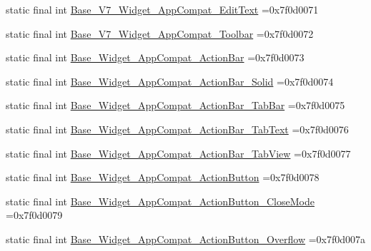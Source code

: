 \begin{DoxyCompactItemize}
\item 
static final int \mbox{\hyperlink{classbr_1_1unb_1_1cic_1_1mp_1_1marketmaster_1_1R_1_1style_a69c5f2b050ad0f94f669394901ca6ee9}{Base\+\_\+\+V7\+\_\+\+Widget\+\_\+\+App\+Compat\+\_\+\+Edit\+Text}} =0x7f0d0071
\item 
static final int \mbox{\hyperlink{classbr_1_1unb_1_1cic_1_1mp_1_1marketmaster_1_1R_1_1style_a447681e0006cc859c5e571cad4abc5b6}{Base\+\_\+\+V7\+\_\+\+Widget\+\_\+\+App\+Compat\+\_\+\+Toolbar}} =0x7f0d0072
\item 
static final int \mbox{\hyperlink{classbr_1_1unb_1_1cic_1_1mp_1_1marketmaster_1_1R_1_1style_ae5d1bd9c51e0013748cc84118859255c}{Base\+\_\+\+Widget\+\_\+\+App\+Compat\+\_\+\+Action\+Bar}} =0x7f0d0073
\item 
static final int \mbox{\hyperlink{classbr_1_1unb_1_1cic_1_1mp_1_1marketmaster_1_1R_1_1style_a1089d7c2f8714ae56abdd1f0379cc9e5}{Base\+\_\+\+Widget\+\_\+\+App\+Compat\+\_\+\+Action\+Bar\+\_\+\+Solid}} =0x7f0d0074
\item 
static final int \mbox{\hyperlink{classbr_1_1unb_1_1cic_1_1mp_1_1marketmaster_1_1R_1_1style_a9ce4d93274226d252f26c3da0dc4b869}{Base\+\_\+\+Widget\+\_\+\+App\+Compat\+\_\+\+Action\+Bar\+\_\+\+Tab\+Bar}} =0x7f0d0075
\item 
static final int \mbox{\hyperlink{classbr_1_1unb_1_1cic_1_1mp_1_1marketmaster_1_1R_1_1style_a8eeb343466f6e878e9281cb6714e2823}{Base\+\_\+\+Widget\+\_\+\+App\+Compat\+\_\+\+Action\+Bar\+\_\+\+Tab\+Text}} =0x7f0d0076
\item 
static final int \mbox{\hyperlink{classbr_1_1unb_1_1cic_1_1mp_1_1marketmaster_1_1R_1_1style_a8692b5f08e333e12ea143744d6ae5ba7}{Base\+\_\+\+Widget\+\_\+\+App\+Compat\+\_\+\+Action\+Bar\+\_\+\+Tab\+View}} =0x7f0d0077
\item 
static final int \mbox{\hyperlink{classbr_1_1unb_1_1cic_1_1mp_1_1marketmaster_1_1R_1_1style_aee4e74947ec9b2ee0585cd343da2d7ce}{Base\+\_\+\+Widget\+\_\+\+App\+Compat\+\_\+\+Action\+Button}} =0x7f0d0078
\item 
static final int \mbox{\hyperlink{classbr_1_1unb_1_1cic_1_1mp_1_1marketmaster_1_1R_1_1style_adf8334d35ff4ed480ce022a18269beef}{Base\+\_\+\+Widget\+\_\+\+App\+Compat\+\_\+\+Action\+Button\+\_\+\+Close\+Mode}} =0x7f0d0079
\item 
static final int \mbox{\hyperlink{classbr_1_1unb_1_1cic_1_1mp_1_1marketmaster_1_1R_1_1style_a887c2c159ff4f51e8464a8a653686dee}{Base\+\_\+\+Widget\+\_\+\+App\+Compat\+\_\+\+Action\+Button\+\_\+\+Overflow}} =0x7f0d007a
\item 

\end{DoxyCompactItemize}
